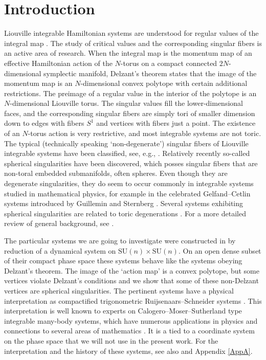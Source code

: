 \documentclass[a4paper,11pt,reqno]{amsart}
\theoremstyle{definition}
\numberwithin{equation}{section}
\def\SU{\mathrm{SU}}                        %
\begin{document}
 \setcounter{tocdepth}{2}

 \newpage

\tableofcontents


\newpage


\section{Introduction}\label{Sec1}

Liouville integrable Hamiltonian systems are understood for regular values of the integral map \cite{Arn}.
The study of critical values and the corresponding singular fibers is an active area of research.
When the integral map is the momentum map of an effective Hamiltonian action of the $N$-torus on
a compact connected $2N$-dimensional  symplectic manifold, Delzant's theorem \cite{D} states that the image
of the momentum map is an $N$-dimensional convex polytope with certain additional restrictions. The preimage of a regular
value in the interior of the polytope is an $N$-dimensional Liouville torus.
The singular values fill the lower-dimensional faces, and the corresponding singular fibers are simply tori of smaller dimension
down to edges with fibers $S^1$ and vertices with fibers just a point.
The existence of an $N$-torus action is very restrictive, and most integrable systems are not toric.
The typical (technically speaking `non-degenerate')  singular fibers of Liouville integrable systems
have been classified, see, e.g.,   \cite{BO,Zung}.
Relatively recently \cite{B} so-called spherical singularities have been discovered,
which posses singular fibers that are non-toral embedded submanifolds, often spheres.
 Even though they are degenerate singularities, they do seem to occur commonly
in integrable systems studied in mathematical physics,
for example in the celebrated Gelfand--Cetlin systems  \cite{BMZ,CK,CKO,NU}
introduced by Guillemin and Sternberg \cite{GS}.
Several systems exhibiting spherical singularities are related to
toric degenerations \cite{HK, NNU,NU-pol}.
For a more detailed review of general background, see  \cite{K}.

The particular systems we are going to investigate
were constructed in \cite{FK}
by reduction of a dynamical system on $\SU(n) \times \SU(n)$.
 On an open dense subset of
their  compact phase space  these systems behave like the systems obeying Delzant's theorem.
The image of the `action map'
is a convex polytope, but some vertices violate Delzant’s conditions
and we show that
some of these non-Delzant vertices are spherical singularities.
The pertinent systems have a physical
interpretation as compactified trigonometric Ruijsenaars--Schneider systems \cite{RIMS95,RS}.
This  interpretation is well known to experts on Calogero--Moser--Sutherland type integrable many-body systems,  which
have numerous applications
in physics and connections to several areas of mathematics \cite{vDVrev,RBanff}.
It is a tied to a coordinate system on the phase space that we will not use in the present work.
 For the interpretation and the history of these systems, see also \cite{FKlim} and Appendix \ref{AppA}.
\end{document}
